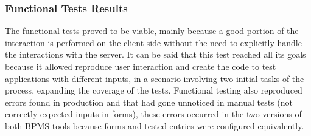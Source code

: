 \documentclass[runningheads,a4paper]{llncs}
\begin{document}
\subsubsection{Functional Tests Results}
The functional tests proved to be viable, mainly because a good portion of the interaction is performed on the client side without the need to explicitly handle the interactions with the server. It can be said that this test reached all its goals because it allowed reproduce user interaction and create the code to test applications with different inputs, in a scenario involving two initial tasks of the process, expanding the coverage of the tests. Functional testing also reproduced errors found in production and that had gone unnoticed in manual tests (not correctly expected inputs in forms), these errors occurred in the two versions of both BPMS tools because forms and tested entries were configured equivalently.
\end{document}
